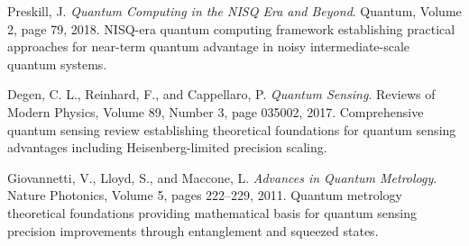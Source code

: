 \documentclass[12pt,a4paper]{article}
\begin{document}
\begin{thebibliography}{99}
Preskill, J.
\textit{Quantum Computing in the NISQ Era and Beyond}.
Quantum, Volume 2, page 79, 2018.
NISQ-era quantum computing framework establishing practical approaches for near-term quantum advantage in noisy intermediate-scale quantum systems.

Degen, C. L., Reinhard, F., and Cappellaro, P.
\textit{Quantum Sensing}.
Reviews of Modern Physics, Volume 89, Number 3, page 035002, 2017.
Comprehensive quantum sensing review establishing theoretical foundations for quantum sensing advantages including Heisenberg-limited precision scaling.

Giovannetti, V., Lloyd, S., and Maccone, L.
\textit{Advances in Quantum Metrology}.
Nature Photonics, Volume 5, pages 222--229, 2011.
Quantum metrology theoretical foundations providing mathematical basis for quantum sensing precision improvements through entanglement and squeezed states.

\end{thebibliography}

\end{document}
